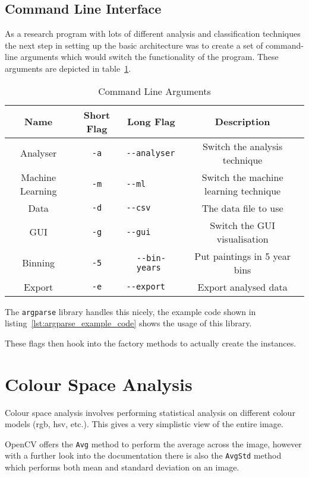 \subsection{Command Line Interface}
As a research program with lots of different analysis and classification techniques the next step
in setting up the basic architecture was to create a set of command-line arguments which would
switch the functionality of the program. These arguments are depicted in table~\ref{tab:args}.

\begin{table}[h]
\centering
\begin{tabular}{|c|c|c|c|} \hline
Name             & Short Flag & Long Flag         & Description\\\hline
Analyser         & \verb+-a+  & \verb+--analyser  +& Switch the analysis technique\\\hline
Machine Learning & \verb+-m+  & \verb+--ml        +& Switch the machine learning technique\\\hline
Data             & \verb+-d+  & \verb+--csv       +& The data file to use\\\hline
GUI              & \verb+-g+  & \verb+--gui       +& Switch the GUI visualisation\\\hline
Binning          & \verb+-5+  & \verb+--bin-years +& Put paintings in 5 year bins\\\hline
Export           & \verb+-e+  & \verb+--export    +& Export analysed data\\\hline
\end{tabular}
\caption{Command Line Arguments}\label{tab:args}
\end{table}

The \texttt{argparse} library handles this nicely, the example code shown in 
listing~\ref{lst:argparse_example_code} shows the usage of this library.

These flags then hook into the factory methods to actually create the instances.


\section{Colour Space Analysis}
Colour space analysis involves performing statistical analysis on different colour models 
(\gls{rgb}, \gls{hsv}, etc.). This gives a very simplistic view of the entire image.

OpenCV offers the \texttt{Avg} method to perform the average across the image, however with a 
further look into the documentation there is also the \texttt{AvgStd} method which performs both 
mean and standard deviation on an image.

